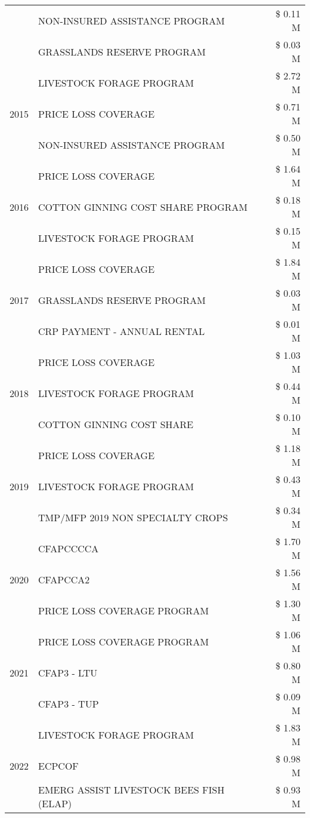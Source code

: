 \begin{tabular}{llr}
 & NON-INSURED ASSISTANCE PROGRAM & \$ 0.11 M \\
 & GRASSLANDS RESERVE PROGRAM & \$ 0.03 M \\
\cline{1-3}
\multirow[t]{3}{*}{2015} & LIVESTOCK FORAGE PROGRAM & \$ 2.72 M \\
 & PRICE LOSS COVERAGE & \$ 0.71 M \\
 & NON-INSURED ASSISTANCE PROGRAM & \$ 0.50 M \\
\cline{1-3}
\multirow[t]{3}{*}{2016} & PRICE LOSS COVERAGE & \$ 1.64 M \\
 & COTTON GINNING COST SHARE PROGRAM & \$ 0.18 M \\
 & LIVESTOCK FORAGE PROGRAM & \$ 0.15 M \\
\cline{1-3}
\multirow[t]{3}{*}{2017} & PRICE LOSS COVERAGE & \$ 1.84 M \\
 & GRASSLANDS RESERVE PROGRAM & \$ 0.03 M \\
 & CRP PAYMENT - ANNUAL RENTAL & \$ 0.01 M \\
\cline{1-3}
\multirow[t]{3}{*}{2018} & PRICE LOSS COVERAGE & \$ 1.03 M \\
 & LIVESTOCK FORAGE PROGRAM & \$ 0.44 M \\
 & COTTON GINNING COST SHARE & \$ 0.10 M \\
\cline{1-3}
\multirow[t]{3}{*}{2019} & PRICE LOSS COVERAGE & \$ 1.18 M \\
 & LIVESTOCK FORAGE PROGRAM & \$ 0.43 M \\
 & TMP/MFP 2019 NON SPECIALTY CROPS & \$ 0.34 M \\
\cline{1-3}
\multirow[t]{3}{*}{2020} & CFAPCCCCA & \$ 1.70 M \\
 & CFAPCCA2 & \$ 1.56 M \\
 & PRICE LOSS COVERAGE PROGRAM & \$ 1.30 M \\
\cline{1-3}
\multirow[t]{3}{*}{2021} & PRICE LOSS COVERAGE PROGRAM & \$ 1.06 M \\
 & CFAP3 - LTU & \$ 0.80 M \\
 & CFAP3 - TUP & \$ 0.09 M \\
\cline{1-3}
\multirow[t]{3}{*}{2022} & LIVESTOCK FORAGE PROGRAM & \$ 1.83 M \\
 & ECPCOF & \$ 0.98 M \\
 & EMERG ASSIST LIVESTOCK BEES FISH (ELAP) & \$ 0.93 M \\
\cline{1-3}
\bottomrule
\end{tabular}
